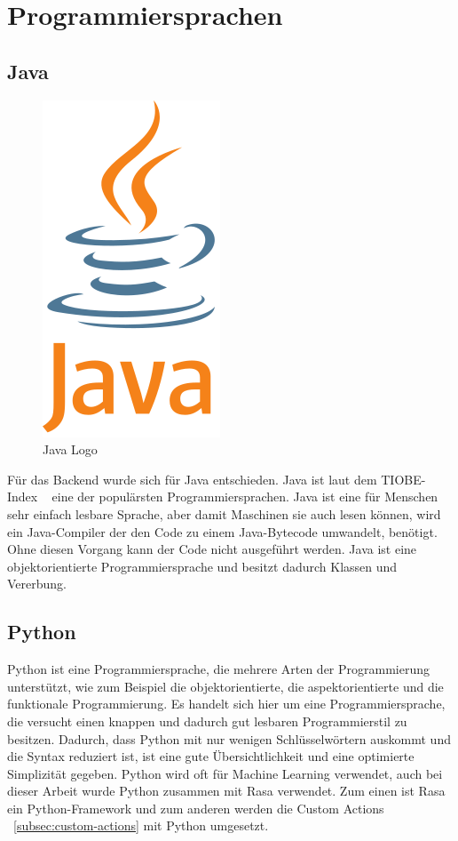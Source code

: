 \section{Programmiersprachen}

\subsection{Java}

\begin{figure}[hbt!]
    \centering
    \includegraphics[scale=0.5]{pics/java}
    \caption{Java Logo\cite{java}}
    \label{fig:impl:java}
\end{figure}

Für das Backend wurde sich für Java entschieden.
Java ist laut dem TIOBE-Index ~\cite{tiobe} eine der populärsten Programmiersprachen.
Java ist eine für Menschen sehr einfach lesbare Sprache, aber damit Maschinen sie auch lesen können, wird ein Java-Compiler der den Code zu einem Java-Bytecode umwandelt, benötigt.
Ohne diesen Vorgang kann der Code nicht ausgeführt werden.
Java ist eine objektorientierte Programmiersprache und besitzt dadurch Klassen und Vererbung\cite{java}.

\subsection{Python}

Python ist eine Programmiersprache, die mehrere Arten der Programmierung unterstützt, wie zum Beispiel die objektorientierte, die aspektorientierte und die funktionale Programmierung.
Es handelt sich hier um eine Programmiersprache, die versucht einen knappen und dadurch gut lesbaren Programmierstil zu besitzen.
Dadurch, dass Python mit nur wenigen Schlüsselwörtern auskommt und die Syntax reduziert ist, ist eine gute Übersichtlichkeit und eine optimierte Simplizität gegeben.
Python wird oft für Machine Learning verwendet, auch bei dieser Arbeit wurde Python zusammen mit Rasa verwendet.
Zum einen ist Rasa ein Python-Framework und zum anderen werden die Custom Actions ~\ref{subsec:custom-actions} mit Python umgesetzt.

